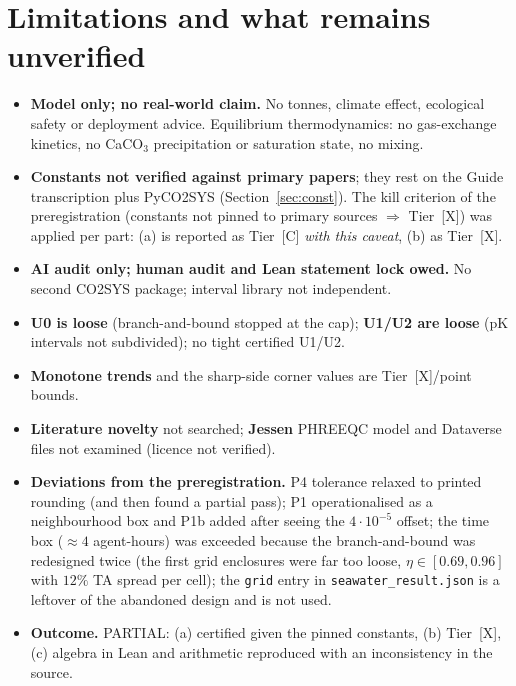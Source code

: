 \documentclass[10pt]{article}
\newcommand{\tier}[1]{\textsf{[#1]}}
\newcommand{\tC}{\tier{C}}
\newcommand{\tX}{\tier{X}}
\begin{document}
\section{Limitations and what remains unverified}\label{sec:lim}
\begin{itemize}\itemsep=1pt
\item \textbf{Model only; no real-world claim.} No tonnes, climate effect, ecological safety or deployment advice. Equilibrium thermodynamics: no gas-exchange kinetics, no CaCO$_3$ precipitation or saturation state, no mixing.
\item \textbf{Constants not verified against primary papers}; they rest on the Guide transcription plus PyCO2SYS (Section~\ref{sec:const}). The kill criterion of the preregistration (constants not pinned to primary sources $\Rightarrow$ Tier~\tX{}) was applied per part: (a) is reported as Tier~\tC{} \emph{with this caveat}, (b) as Tier~\tX{}.
\item \textbf{AI audit only; human audit and Lean statement lock owed.} No second CO2SYS package; interval library not independent.
\item \textbf{U0 is loose} (branch-and-bound stopped at the cap); \textbf{U1/U2 are loose} (pK intervals not subdivided); no tight certified U1/U2.
\item \textbf{Monotone trends} and the sharp-side corner values are Tier~\tX{}/point bounds.
\item \textbf{Literature novelty} not searched; \textbf{Jessen} PHREEQC model and Dataverse files not examined (licence not verified).
\item \textbf{Deviations from the preregistration.} P4 tolerance relaxed to printed rounding (and then found a partial pass); P1 operationalised as a neighbourhood box and P1b added after seeing the $4\cdot10^{-5}$ offset; the time box ($\approx4$ agent-hours) was exceeded because the branch-and-bound was redesigned twice (the first grid enclosures were far too loose, $\eta\in[0.69,0.96]$ with $12\%$ TA spread per cell); the \texttt{grid} entry in \texttt{seawater\_result.json} is a leftover of the abandoned design and is not used.
\item \textbf{Outcome.} PARTIAL: (a) certified given the pinned constants, (b) Tier~\tX{}, (c) algebra in Lean and arithmetic reproduced with an inconsistency in the source.
\end{itemize}

\end{document}
